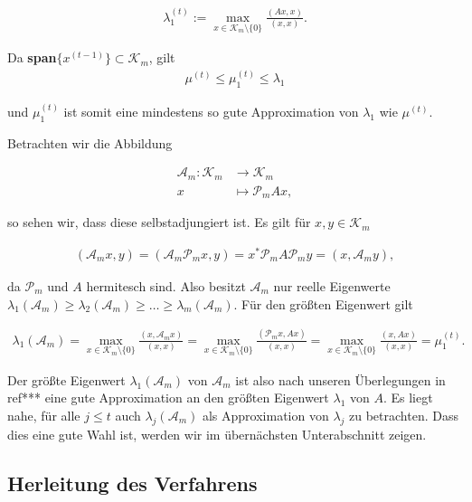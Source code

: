 \documentclass{article}
\begin{document}
\begin{align*}
	\lambda_1^{(t)} := \max_{x \in \mathcal{K}_m \setminus \{0\}} \frac{(Ax,x)}{(x,x)}.
\end{align*}

Da \textbf{span}$\{x^{(t-1)}\} \subset \mathcal{K}_m$, gilt
\begin{align*}
	\mu^{(t)} \leq \mu_1^{(t)} \leq \lambda_1
\end{align*}

und $\mu_1^{(t)}$ ist somit eine mindestens so gute Approximation von $\lambda_1$ wie $\mu^{(t)}$.

Betrachten wir die Abbildung

\begin{align*}
	\mathcal{A}_m: \mathcal{K}_m &\to \mathcal{K}_m \\
	x &\mapsto \mathcal{P}_m Ax,
\end{align*}

so sehen wir, dass diese selbstadjungiert ist. Es gilt für $x,y \in \mathcal{K}_m$

\begin{align*}
	(\mathcal{A}_mx, y) = (\mathcal{A}_m\mathcal{P}_m x, y) = x^*\mathcal{P}_m A \mathcal{P}_m y = (x, \mathcal{A}_m y),
\end{align*}

da $\mathcal{P}_m$ und $A$ hermitesch sind. Also besitzt $ \mathcal{A}_m$ nur reelle Eigenwerte $\lambda_1(\mathcal{A}_m) \geq \lambda_2(\mathcal{A}_m) \geq \dots \geq \lambda_m(\mathcal{A}_m)$. Für den größten Eigenwert gilt

\begin{align*}
	\lambda_1(\mathcal{A}_m) = \max_{x \in \mathcal{K}_m \setminus \{0\}} \frac{(x, \mathcal{A}_m x)}{(x,x)} = \max_{x \in \mathcal{K}_m \setminus \{0\}} \frac{(\mathcal{P}_m x, A x)}{(x,x)} = \max_{x \in \mathcal{K}_m \setminus \{0\}} \frac{(x, A x)}{(x,x)} = \mu_1^{(t)}.
\end{align*}

Der größte Eigenwert $\lambda_1(\mathcal{A}_m)$ von $\mathcal{A}_m$ ist also nach unseren Überlegungen in ref*** eine gute Approximation an den größten Eigenwert $\lambda_1$ von $A$. Es liegt nahe, für alle $j \leq t$ auch $\lambda_j(\mathcal{A}_m)$ als Approximation von $\lambda_j$ zu betrachten. Dass dies eine gute Wahl ist, werden wir im übernächsten Unterabschnitt zeigen.

\subsection{Herleitung des Verfahrens}
\end{document}
